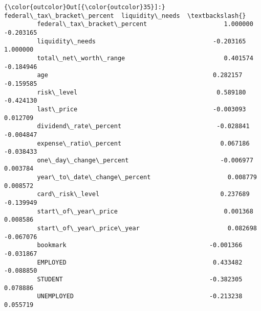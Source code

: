 \documentclass[11pt]{article}
\begin{document}
\begin{Verbatim}[commandchars=\\\{\}]
{\color{outcolor}Out[{\color{outcolor}35}]:}                              federal\_tax\_bracket\_percent  liquidity\_needs  \textbackslash{}
         federal\_tax\_bracket\_percent                     1.000000        -0.203165   
         liquidity\_needs                                -0.203165         1.000000   
         total\_net\_worth\_range                           0.401574        -0.184946   
         age                                             0.282157        -0.159585   
         risk\_level                                      0.589180        -0.424130   
         last\_price                                     -0.003093         0.012709   
         dividend\_rate\_percent                          -0.028841        -0.004847   
         expense\_ratio\_percent                           0.067186        -0.038433   
         one\_day\_change\_percent                         -0.006977         0.003784   
         year\_to\_date\_change\_percent                     0.008779         0.008572   
         card\_risk\_level                                 0.237689        -0.139949   
         start\_of\_year\_price                             0.001368         0.008586   
         start\_of\_year\_price\_year                        0.082698        -0.067076   
         bookmark                                       -0.001366        -0.031867   
         EMPLOYED                                        0.433482        -0.088850   
         STUDENT                                        -0.382305         0.078886   
         UNEMPLOYED                                     -0.213238         0.055719   
         

\end{Verbatim}
\end{document}
